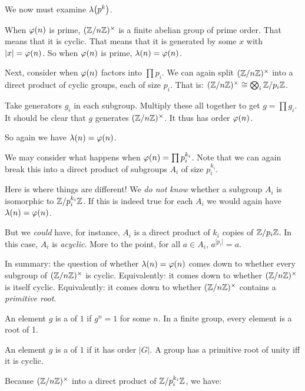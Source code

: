 \begin{remark}
  We now must examine $\lambda\mathopen{}\left( {p^k} \right)\mathclose{}$.
\end{remark}

\begin{remark}
  When $\varphi\mathopen{}\left( {n} \right)\mathclose{}$ is prime, $\mathopen{}\left( {\mathbb{Z} / n\mathbb{Z}} \right)\mathclose{}^\times$ is a finite abelian group of
  prime order. That means that it is cyclic. That means that it is
  generated by some $x$ with $|x| = \varphi\mathopen{}\left( {n} \right)\mathclose{}$. So when $\varphi\mathopen{}\left( {n} \right)\mathclose{}$ is
  prime, $\lambda(n) = \varphi\mathopen{}\left( {n} \right)\mathclose{}$.
\end{remark}

\begin{remark}
  Next, consider when $\varphi\mathopen{}\left( {n} \right)\mathclose{}$ factors into $\prod p_i$. We can
  again split $\mathopen{}\left( {\mathbb{Z} / n\mathbb{Z}} \right)\mathclose{}^\times$ into a direct product of cyclic groups, each of
  size $p_i$. That is: $\mathopen{}\left( {\mathbb{Z} / n\mathbb{Z}} \right)\mathclose{}^\times \cong \bigotimes_i \mathbb{Z} / p_i\mathbb{Z}$.

  Take generators $g_i$ in each subgroup. Multiply these all together to
  get $g = \prod g_i$. It should be clear that $g$ generates $\mathopen{}\left( {\mathbb{Z} / n\mathbb{Z}} \right)\mathclose{}^\times$.
  It thus has order $\varphi\mathopen{}\left( {n} \right)\mathclose{}$.

  So again we have $\lambda(n) = \varphi\mathopen{}\left( {n} \right)\mathclose{}$.
\end{remark}

\begin{remark}
  We may consider what happens when $\varphi\mathopen{}\left( {n} \right)\mathclose{} = \prod p_i^{k_i}$. Note
  that we can again break this into a direct product of subgroups $A_i$
  of size $p_i^{k_i}$.

  Here is where things are different! We \emph{do not know} whether a
  subgroup $A_i$ is isomorphic to $\mathbb{Z} / p_i^{k_i}\mathbb{Z}$. If this is indeed
  true for each $A_i$ we would again have $\lambda(n) = \varphi\mathopen{}\left( {n} \right)\mathclose{}$.

  But we \emph{could} have, for instance, $A_i$ is a direct product of
  $k_i$ copies of $\mathbb{Z} / p_i\mathbb{Z}$. In this case, $A_i$ is \emph{acyclic}.
  More to the point, for all $a \in A_i$, $a^{|p_i|} = a$.

  In summary: the question of whether $\lambda(n) = \varphi\mathopen{}\left( {n} \right)\mathclose{}$ comes
  down to whether every subgroup of $\mathopen{}\left( {\mathbb{Z} / n\mathbb{Z}} \right)\mathclose{}^\times$ is cyclic. Equivalently:
  it comes down to whether $\mathopen{}\left( {\mathbb{Z} / n\mathbb{Z}} \right)\mathclose{}^\times$ is itself cyclic. Equivalently: it
  comes down to whether $\mathopen{}\left( {\mathbb{Z} / n\mathbb{Z}} \right)\mathclose{}^\times$ contains a \emph{primitive root}.
\end{remark}

\begin{definition}
  An element $g$ is a  of $1$ if $g^n = 1$ for some $n$. In
  a finite group, every element is a root of 1.

  An element $g$ is a  of $1$ if it has order
  $|G|$. A group has a primitive root of unity iff it is cyclic.
\end{definition}

\begin{proposition}
  Because $\mathopen{}\left( {\mathbb{Z} / n\mathbb{Z}} \right)\mathclose{}^\times$ into a direct product of $\mathbb{Z} / p_i^{k_i}\mathbb{Z}$, we
  have:

  \begin{nedqn}
  \eqcol
    \lcm{}
  \end{nedqn}
\end{proposition}
